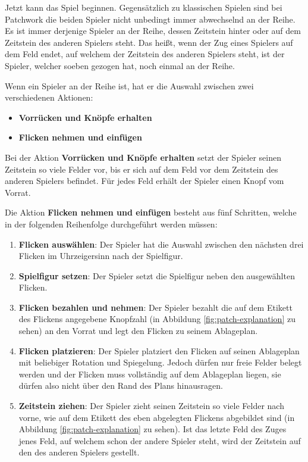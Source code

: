 Jetzt kann das Spiel beginnen. Gegensätzlich zu klassischen Spielen sind bei Patchwork die beiden Spieler nicht unbedingt immer abwechselnd an der Reihe. Es ist immer derjenige Spieler an der Reihe, dessen Zeitstein hinter oder auf dem Zeitstein des anderen Spielers steht. Das heißt, wenn der Zug eines Spielers auf dem Feld endet, auf welchem der Zeitstein des anderen Spielers steht, ist der Spieler, welcher soeben gezogen hat, noch einmal an der Reihe. \cite{2014.PatchworkSpielanleitung}

Wenn ein Spieler an der Reihe ist, hat er die Auswahl zwischen zwei verschiedenen Aktionen:

\begin{itemize}
    \item \textbf{Vorrücken und Knöpfe erhalten} \cite{2014.PatchworkSpielanleitung}
    \item \textbf{Flicken nehmen und einfügen} \cite{2014.PatchworkSpielanleitung}
\end{itemize}

Bei der Aktion \textbf{Vorrücken und Knöpfe erhalten} setzt der Spieler seinen Zeitstein so viele Felder vor, bis er sich auf dem Feld vor dem Zeitstein des anderen Spielers befindet. Für jedes Feld erhält der Spieler einen Knopf vom Vorrat. \cite{2014.PatchworkSpielanleitung}

Die Aktion \textbf{Flicken nehmen und einfügen} besteht aus fünf Schritten, welche in der folgenden Reihenfolge durchgeführt werden müssen:

\begin{enumerate}
    \item \textbf{Flicken auswählen}: Der Spieler hat die Auswahl zwischen den nächsten drei Flicken im Uhrzeigersinn nach der Spielfigur. \cite{2014.PatchworkSpielanleitung}
    \item \textbf{Spielfigur setzen}: Der Spieler setzt die Spielfigur neben den ausgewählten Flicken. \cite{2014.PatchworkSpielanleitung}
    \item \textbf{Flicken bezahlen und nehmen}: Der Spieler bezahlt die auf dem Etikett des Flickens angegebene Knopfzahl (in Abbildung \ref{fig:patch-explanation} zu sehen) an den Vorrat und legt den Flicken zu seinem Ablageplan. \cite{2014.PatchworkSpielanleitung}
    \item \textbf{Flicken platzieren}: Der Spieler platziert den Flicken auf seinen Ablageplan mit beliebiger Rotation und Spiegelung. Jedoch dürfen nur freie Felder belegt werden und der Flicken muss vollständig auf dem Ablageplan liegen, sie dürfen also nicht über den Rand des Plans hinausragen. \cite{2014.PatchworkSpielanleitung}
    \item \textbf{Zeitstein ziehen}: Der Spieler zieht seinen Zeitstein so viele Felder nach vorne, wie auf dem Etikett des eben abgelegten Flickens abgebildet sind (in Abbildung \ref{fig:patch-explanation} zu sehen). Ist das letzte Feld des Zuges jenes Feld, auf welchem schon der andere Spieler steht, wird der Zeitstein auf den des anderen Spielers gestellt. \cite{2014.PatchworkSpielanleitung}
\end{enumerate}

